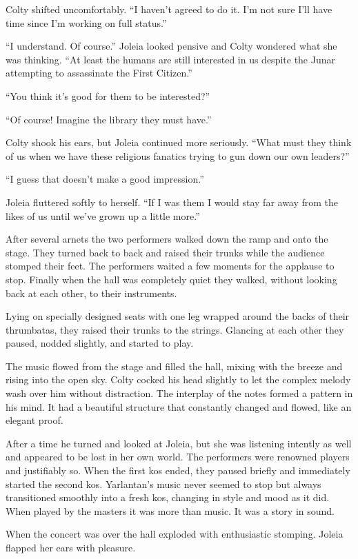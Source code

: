 Colty shifted uncomfortably. ``I haven't agreed to do it. I'm not sure I'll have time since I'm
working on full status.''

``I understand. Of course.'' Joleia looked pensive and Colty wondered what she was thinking.
``At least the humans are still interested in us despite the Junar attempting to assassinate the
First Citizen.''

``You think it's good for them to be interested?''

``Of course! Imagine the library they must have.''

Colty shook his ears, but Joleia continued more seriously. ``What must they think of us when we
have these religious fanatics trying to gun down our own leaders?''

``I guess that doesn't make a good impression.''

Joleia fluttered softly to herself. ``If I was them I would stay far away from the likes of us
until we've grown up a little more.''

After several arnets the two performers walked down the ramp and onto the stage. They turned
back to back and raised their trunks while the audience stomped their feet. The performers
waited a few moments for the applause to stop. Finally when the hall was completely quiet they
walked, without looking back at each other, to their instruments.

Lying on specially designed seats with one leg wrapped around the backs of their thrumbatas,
they raised their trunks to the strings. Glancing at each other they paused, nodded slightly,
and started to play.

The music flowed from the stage and filled the hall, mixing with the breeze and rising into the
open sky. Colty cocked his head slightly to let the complex melody wash over him without
distraction. The interplay of the notes formed a pattern in his mind. It had a beautiful
structure that constantly changed and flowed, like an elegant proof.

After a time he turned and looked at Joleia, but she was listening intently as well and appeared
to be lost in her own world. The performers were renowned players and justifiably so. When the
first kos ended, they paused briefly and immediately started the second kos. Yarlantan's music
never seemed to stop but always transitioned smoothly into a fresh kos, changing in style and
mood as it did. When played by the masters it was more than music. It was a story in sound.

When the concert was over the hall exploded with enthusiastic stomping. Joleia flapped her ears
with pleasure.

